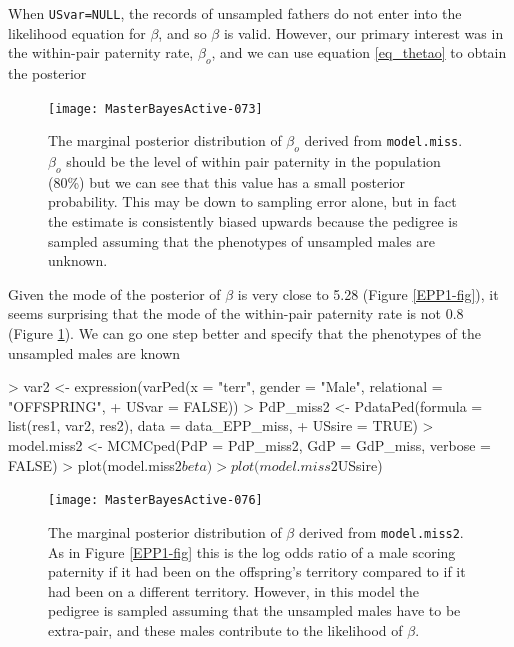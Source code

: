\documentclass{article}
\begin{document}
When \texttt{USvar=NULL}, the records of unsampled fathers do not enter into the likelihood equation for $\beta$, and so $\beta$ is valid.  However, our primary interest was in the within-pair paternity rate, $\beta_{o}$, and we can use equation \ref{eq_thetao} to obtain the posterior

\begin{Schunk}
\end{Schunk}


\begin{figure}[!h]
\begin{center}
\texttt{[image: MasterBayesActive-073]}
\end{center}
\caption{The marginal posterior distribution of $\beta_{o}$ derived from \texttt{model.miss}.  $\beta_{o}$ should be the level of within pair paternity in the population (80\%) but we can see that this value has a small posterior probability.  This may be down to sampling error alone, but in fact the estimate is consistently biased upwards because the pedigree is sampled assuming that the phenotypes of unsampled males are unknown.}
\label{EPP1Test-fig}
\end{figure}


Given the mode of the posterior of $\beta$ is very close to 5.28 (Figure \ref{EPP1-fig}), it seems surprising that the mode of the within-pair paternity rate is not 0.8 (Figure \ref{EPP1Test-fig}). We can go one step better and specify that the phenotypes of the unsampled males are known 

\begin{Schunk}
\begin{Sinput}
> var2 <- expression(varPed(x = "terr", gender = "Male", relational = "OFFSPRING", 
+     USvar = FALSE))
> PdP_miss2 <- PdataPed(formula = list(res1, var2, res2), data = data_EPP_miss, 
+     USsire = TRUE)
> model.miss2 <- MCMCped(PdP = PdP_miss2, GdP = GdP_miss, verbose = FALSE)
> plot(model.miss2$beta)
> plot(model.miss2$USsire)
\end{Sinput}
\end{Schunk}


\begin{figure}[!h]
\begin{center}
\texttt{[image: MasterBayesActive-076]}
\end{center}
\caption{The marginal posterior distribution of $\beta$ derived from \texttt{model.miss2}. As in Figure \ref{EPP1-fig} this is the log odds ratio of a male scoring paternity if it had been on the offspring's territory compared to if it had been on a different territory. However, in this model the pedigree is sampled assuming that the unsampled males have to be extra-pair, and these males contribute to the likelihood of $\beta$.}
\label{model.miss2-fig}
\end{figure}
\end{document}
